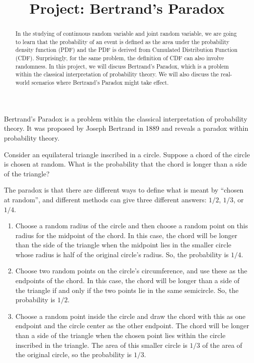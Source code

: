 \documentclass{article}
\title{Project: Bertrand's Paradox}
\author{}
\date{}
\begin{document}
\maketitle

\begin{abstract}
    In the studying of continuous random variable and joint random variable, we are going to learn that the probability of an event is defined as the area under the probability density function (PDF) and the PDF is derived from Cumulated Distribution Function (CDF). Surprisingly, for the same problem, the definition of CDF can also involve randomness. In this project, we will discuss Bertrand's Paradox, which is a problem within the classical interpretation of probability theory. We will also discuss the real-world scenarios where Bertrand's Paradox might take effect.
\end{abstract}

Bertrand's Paradox is a problem within the classical interpretation of probability theory. It was proposed by Joseph Bertrand in 1889 and reveals a paradox within probability theory.

Consider an equilateral triangle inscribed in a circle. Suppose a chord of the circle is chosen at random. What is the probability that the chord is longer than a side of the triangle?

The paradox is that there are different ways to define what is meant by ``chosen at random'', and different methods can give three different answers: $1/2$, $1/3$, or $1/4$.

\begin{enumerate}
    \item Choose a random radius of the circle and then choose a random point on this radius for the midpoint of the chord. In this case, the chord will be longer than the side of the triangle when the midpoint lies in the smaller circle whose radius is half of the original circle's radius. So, the probability is $1/4$.
    \item Choose two random points on the circle's circumference, and use these as the endpoints of the chord. In this case, the chord will be longer than a side of the triangle if and only if the two points lie in the same semicircle. So, the probability is $1/2$.
    \item Choose a random point inside the circle and draw the chord with this as one endpoint and the circle center as the other endpoint. The chord will be longer than a side of the triangle when the chosen point lies within the circle inscribed in the triangle. The area of this smaller circle is $1/3$ of the area of the original circle, so the probability is $1/3$.
\end{enumerate}
\end{document}

